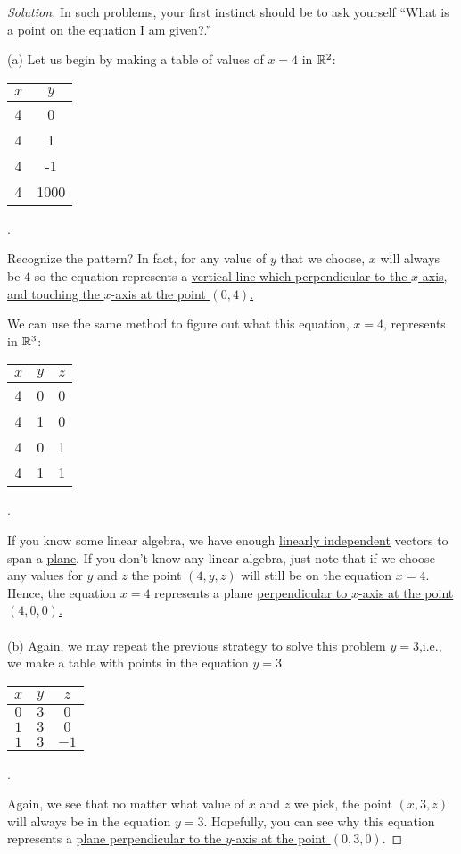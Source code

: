 \begin{proof}[Solution]
In such problems, your first instinct should be to ask yourself ``What is a
point on the equation I am given?.''

(a) Let us begin by making a table of values of $x=4$ in $\mathbb{R}^2$:
\begin{center}
\begin{tabular}{|c|c|}
\hline
$x$&$y$\\
\hline
4&0\\
4&1\\
4&-1\\
4&1000\\
\hline
\end{tabular}.
\end{center}
Recognize the pattern? In fact, for any value of $y$ that we choose, $x$
will always be $4$ so the equation represents a \ul{vertical line which
  perpendicular to the $x$-axis, and touching the $x$-axis at the point
  $(0,4)$.}

We can use the same method to figure out what this equation, $x=4$,
represents in $\mathbb{R}^3$:
\begin{center}
\begin{tabular}{|c|c|c|}
\hline
$x$&$y$&$z$\\
\hline
4&0&0\\
4&1&0\\
4&0&1\\
4&1&1\\
\hline
\end{tabular}.
\end{center}
If you know some linear algebra, we have enough
\href{https://en.wikipedia.org/wiki/Linear_independence}{linearly
  independent} vectors to span a \ul{plane}. If you don't know any
linear algebra, just note that if we choose any values for $y$ and $z$ the
point $(4,y,z)$ will still be on the equation $x=4$. Hence, the equation
$x=4$ represents a plane \ul{perpendicular to $x$-axis at the
  point $(4,0,0)$.}
\\\\
(b) Again, we may repeat the previous strategy to solve this problem
$y=3$,i.e., we make a table with points in the equation $y=3$
\begin{center}
\begin{tabular}{|c|c|c|}
\hline
$x$&$y$&$z$\\
\hline
$0$&$3$&$0$\\
$1$&$3$&$0$\\
$1$&$3$&$-1$\\
\hline
\end{tabular}.
\end{center}
Again, we see that no matter what value of $x$ and $z$ we pick, the point
$(x,3,z)$ will always be in the equation $y=3$. Hopefully, you can see why
this equation represents a \ul{plane perpendicular to the $y$-axis at the
  point $(0,3,0)$}.


\end{proof}
